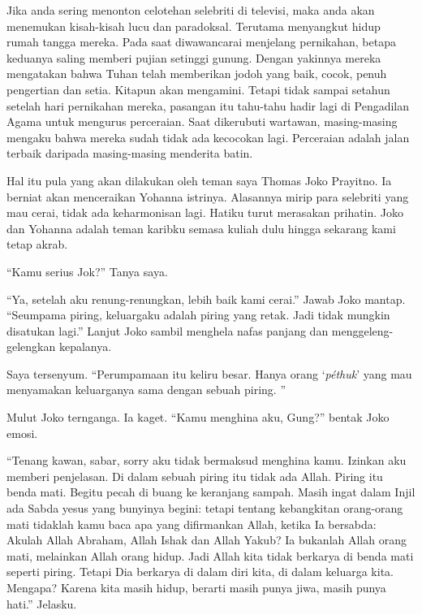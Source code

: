 
	Jika anda sering menonton celotehan selebriti di televisi, maka anda akan menemukan kisah-kisah lucu dan paradoksal. Terutama menyangkut hidup rumah tangga mereka. Pada saat diwawancarai menjelang pernikahan, betapa keduanya saling memberi pujian setinggi gunung. Dengan yakinnya mereka mengatakan bahwa Tuhan telah memberikan jodoh yang baik, cocok, penuh pengertian dan setia. Kitapun akan mengamini. Tetapi tidak sampai setahun setelah hari pernikahan mereka, pasangan itu tahu-tahu hadir lagi di Pengadilan Agama untuk mengurus  perceraian. Saat dikerubuti wartawan, masing-masing mengaku bahwa mereka sudah tidak ada kecocokan lagi. Perceraian adalah jalan terbaik daripada masing-masing menderita batin.

	Hal itu pula yang akan dilakukan oleh teman saya Thomas Joko Prayitno. Ia berniat akan menceraikan Yohanna istrinya. Alasannya mirip para selebriti yang mau cerai, tidak ada keharmonisan lagi. Hatiku turut merasakan prihatin. Joko dan Yohanna adalah teman karibku semasa kuliah dulu hingga sekarang kami tetap akrab.

``Kamu serius Jok?'' Tanya saya.

``Ya, setelah aku renung-renungkan, lebih baik kami cerai.'' Jawab Joko mantap. ``Seumpama piring, keluargaku adalah piring yang retak. Jadi tidak mungkin disatukan lagi.'' Lanjut Joko sambil menghela nafas panjang dan menggeleng-gelengkan kepalanya.

Saya tersenyum. ``Perumpamaan itu keliru besar. Hanya orang `\textit{p\'{e}thuk}'  yang mau menyamakan keluarganya sama dengan sebuah piring. ''

Mulut Joko ternganga. Ia kaget. ``Kamu menghina aku, Gung?'' bentak Joko emosi.

``Tenang kawan, sabar, sorry aku tidak bermaksud menghina kamu. Izinkan aku memberi penjelasan. Di dalam sebuah piring itu tidak ada Allah. Piring itu benda mati. Begitu pecah di buang ke keranjang sampah. Masih ingat dalam Injil ada Sabda yesus yang bunyinya begini: tetapi tentang kebangkitan orang-orang mati tidaklah kamu baca apa yang difirmankan Allah, ketika Ia bersabda: Akulah Allah Abraham, Allah Ishak dan Allah Yakub? Ia bukanlah Allah orang mati, melainkan Allah orang hidup. Jadi Allah kita tidak berkarya di benda mati seperti piring. Tetapi Dia berkarya di dalam diri kita, di dalam keluarga kita. Mengapa? Karena kita masih hidup, berarti masih punya jiwa, masih punya hati.'' Jelasku.

